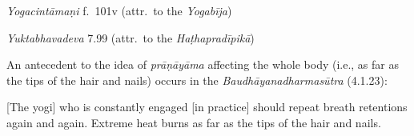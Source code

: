 \begin{ekdosis}
\begin{testimonia}[hp02_049]
\emph{Yogacintāmaṇi} f.~101v (attr.~to the \emph{Yogabīja})
\begin{versinnote} 
\end{versinnote}

\emph{Yuktabhavadeva} 7.99 (attr.~to the \emph{Haṭhapradīpikā})

\begin{versinnote}
\end{versinnote}
\end{testimonia}

\begin{philcomm}[hp02_049]


An antecedent to the idea of \emph{prāṇāyāma} affecting the whole body (i.e., as far as the tips of the hair and nails) occurs in the \emph{Baudhāyanadharmasūtra} (4.1.23):

\begin{versinnote}
{}[The yogi] who is constantly engaged [in practice] should repeat breath retentions again and again. Extreme heat burns as far as the tips of the hair and nails. 
\end{versinnote}

\begin{versinnote}
\end{versinnote}


\end{philcomm}
\end{ekdosis}
